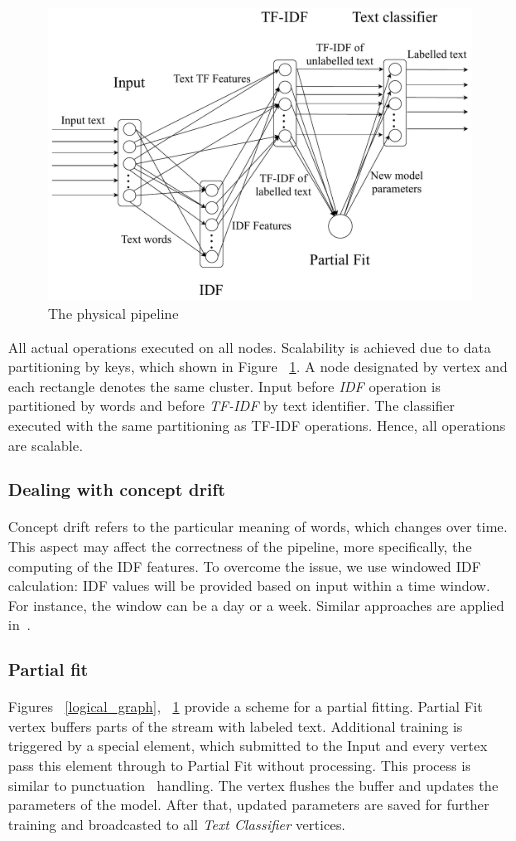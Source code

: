 \begin{figure}[htbp]
  \centering
  \includegraphics[scale=0.375]{pics/physical-graph}
  \caption{The physical pipeline}
  \label {physical_graph}
\end{figure}

All actual operations executed on all nodes. Scalability is achieved due to data partitioning by keys, which shown in Figure ~\ref{physical_graph}. A node designated by vertex and each rectangle denotes the same cluster. Input before {\em IDF} operation is partitioned by words and before {\em TF-IDF} by text identifier. The classifier executed with the same partitioning as TF-IDF operations. Hence, all operations are scalable. 

\subsubsection{Dealing with concept drift}

Concept drift refers to the particular meaning of words, which changes over time. This aspect may affect the correctness of the pipeline, more specifically, the computing of the IDF features. To overcome the issue, we use windowed IDF calculation: IDF values will be provided based on input within a time window. For instance, the window can be a day or a week. Similar approaches are applied in~\cite{klinkenberg2000detecting}.

\subsubsection{Partial fit}

Figures ~\ref{logical_graph}, ~\ref{physical_graph} provide a scheme for a partial fitting. Partial Fit vertex buffers parts of the stream with labeled text. Additional training is triggered by a special element, which submitted to the Input and every vertex pass this element through to Partial Fit without processing. This process is similar to punctuation~\cite{tucker2003exploiting} handling. The vertex flushes the buffer and updates the parameters of the model. After that, updated parameters are saved for further training and broadcasted to all {\em Text Classifier} vertices.

